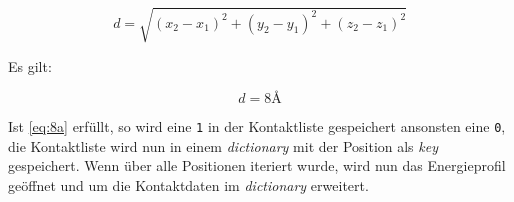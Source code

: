 \begin{equation}
    d=\sqrt{(x_2-x_1)^2+(y_2-y_1)^2+(z_2-z_1)^2}
    \label{eq:abstand}
\end{equation}

Es gilt:

\begin{equation}
    d = 8\text{\AA}
    \label{eq:8a}
\end{equation}

Ist \ref{eq:8a} erfüllt, so wird eine \texttt{1} in der Kontaktliste gespeichert ansonsten eine \texttt{0}, die Kontaktliste wird nun in einem \emph{dictionary} mit der Position als \emph{key} gespeichert. Wenn über alle Positionen iteriert wurde, wird nun das Energieprofil geöffnet und um die Kontaktdaten im \emph{dictionary} erweitert.
